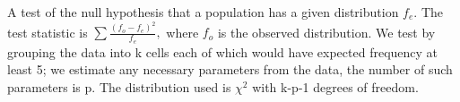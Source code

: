  A test of the null hypothesis that a population has a given
distribution $f_{e}.$  The test statistic is
$ \sum \frac{(f_o - f_e ) ^2 } {f_e} , $ where $f_{o}$  is the
observed distribution. We test by grouping
the data into k cells each of which would have expected frequency 
at least 5; we estimate any necessary parameters from the data, the number
of such parameters is p. The distribution
used is $ \chi ^2 $ with k-p-1 degrees of freedom.
